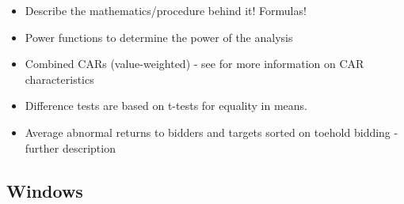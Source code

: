 \documentclass[12pt]{article}
\begin{document}
\begin{itemize}
        \item Describe the mathematics/procedure behind it! Formulas! 

        \item Power functions to determine the power of the analysis

        \item Combined CARs (value-weighted) - see \citet{Mitchell2011} for more information on CAR characteristics

        \item Difference tests are based on t-tests for equality in means. \citep{Moeller2004}

        \item Average abnormal returns to bidders and targets sorted on toehold bidding - further description \citep{Betton2009}
        
    \end{itemize}

\subsection{Windows}
\end{document}
